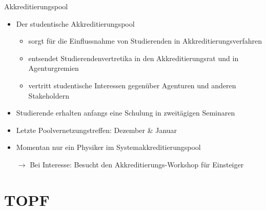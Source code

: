 \documentclass[compress, aspectratio=169]{beamer}
\begin{document}
\begin{frame}{Akkreditierungspool}
    \begin{itemize}
        \item Der studentische Akkreditierungspool
        \begin{itemize}
        	\item sorgt für die Einflussnahme von Studierenden in Akkreditierungsverfahren
        	\item entsendet Studierendenvertretika in den Akkreditierungsrat und in Agenturgremien
        	\item vertritt studentische Interessen gegenüber Agenturen und anderen Stakeholdern
        \end{itemize}         
        \item Studierende erhalten anfangs eine Schulung in zweitägigen Seminaren
        \item Letzte Poolvernetzungstreffen: Dezember \& Januar
        \vspace{0.5cm}
        \item Momentan nur ein Physiker im Systemakkreditierungspool
        \item[$\rightarrow$] Bei Interesse: Besucht den Akkreditierungs-Workshop für Einsteiger
    \end{itemize}
\end{frame}


\section{TOPF}
\end{document}
